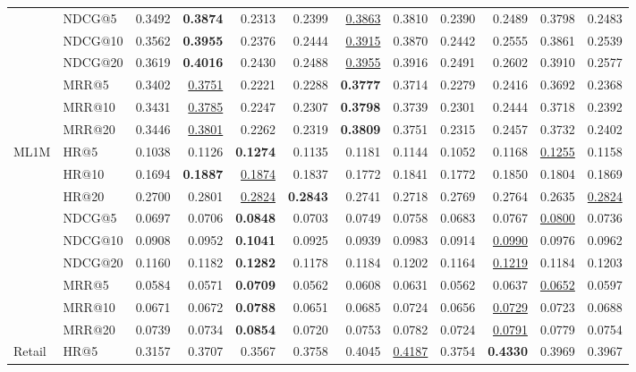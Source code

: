 \begin{tabular}{llrrrrrrrrrr}
 & NDCG@5 & 0.3492 & \textbf{0.3874} & 0.2313 & 0.2399 & \underline{0.3863} & 0.3810 & 0.2390 & 0.2489 & 0.3798 & 0.2483 \\
 & NDCG@10 & 0.3562 & \textbf{0.3955} & 0.2376 & 0.2444 & \underline{0.3915} & 0.3870 & 0.2442 & 0.2555 & 0.3861 & 0.2539 \\
 & NDCG@20 & 0.3619 & \textbf{0.4016} & 0.2430 & 0.2488 & \underline{0.3955} & 0.3916 & 0.2491 & 0.2602 & 0.3910 & 0.2577 \\
 & MRR@5 & 0.3402 & \underline{0.3751} & 0.2221 & 0.2288 & \textbf{0.3777} & 0.3714 & 0.2279 & 0.2416 & 0.3692 & 0.2368 \\
 & MRR@10 & 0.3431 & \underline{0.3785} & 0.2247 & 0.2307 & \textbf{0.3798} & 0.3739 & 0.2301 & 0.2444 & 0.3718 & 0.2392 \\
 & MRR@20 & 0.3446 & \underline{0.3801} & 0.2262 & 0.2319 & \textbf{0.3809} & 0.3751 & 0.2315 & 0.2457 & 0.3732 & 0.2402 \\
\hline
ML1M & HR@5 & 0.1038 & 0.1126 & \textbf{0.1274} & 0.1135 & 0.1181 & 0.1144 & 0.1052 & 0.1168 & \underline{0.1255} & 0.1158 \\
 & HR@10 & 0.1694 & \textbf{0.1887} & \underline{0.1874} & 0.1837 & 0.1772 & 0.1841 & 0.1772 & 0.1850 & 0.1804 & 0.1869 \\
 & HR@20 & 0.2700 & 0.2801 & \underline{0.2824} & \textbf{0.2843} & 0.2741 & 0.2718 & 0.2769 & 0.2764 & 0.2635 & \underline{0.2824} \\
 & NDCG@5 & 0.0697 & 0.0706 & \textbf{0.0848} & 0.0703 & 0.0749 & 0.0758 & 0.0683 & 0.0767 & \underline{0.0800} & 0.0736 \\
 & NDCG@10 & 0.0908 & 0.0952 & \textbf{0.1041} & 0.0925 & 0.0939 & 0.0983 & 0.0914 & \underline{0.0990} & 0.0976 & 0.0962 \\
 & NDCG@20 & 0.1160 & 0.1182 & \textbf{0.1282} & 0.1178 & 0.1184 & 0.1202 & 0.1164 & \underline{0.1219} & 0.1184 & 0.1203 \\
 & MRR@5 & 0.0584 & 0.0571 & \textbf{0.0709} & 0.0562 & 0.0608 & 0.0631 & 0.0562 & 0.0637 & \underline{0.0652} & 0.0597 \\
 & MRR@10 & 0.0671 & 0.0672 & \textbf{0.0788} & 0.0651 & 0.0685 & 0.0724 & 0.0656 & \underline{0.0729} & 0.0723 & 0.0688 \\
 & MRR@20 & 0.0739 & 0.0734 & \textbf{0.0854} & 0.0720 & 0.0753 & 0.0782 & 0.0724 & \underline{0.0791} & 0.0779 & 0.0754 \\
\hline
Retail & HR@5 & 0.3157 & 0.3707 & 0.3567 & 0.3758 & 0.4045 & \underline{0.4187} & 0.3754 & \textbf{0.4330} & 0.3969 & 0.3967 \\

\end{tabular}
